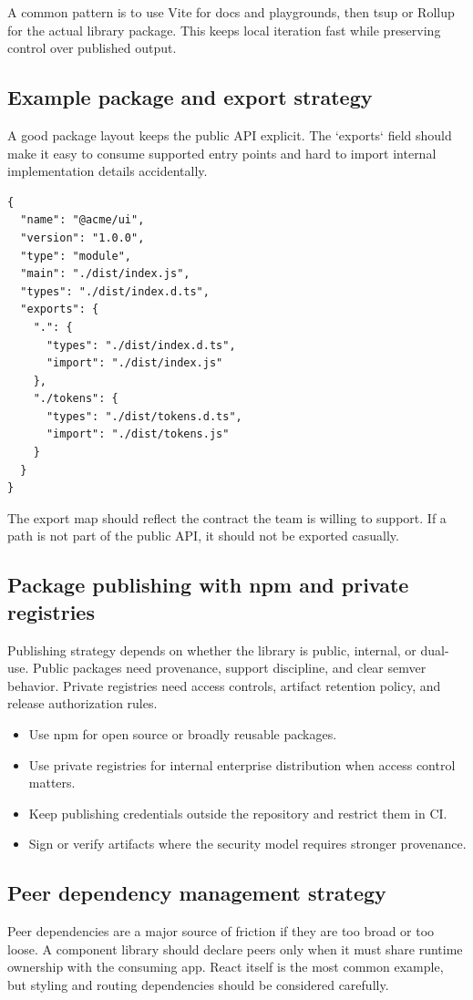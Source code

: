 A common pattern is to use Vite for docs and playgrounds, then tsup or Rollup for the actual library package. This keeps local iteration fast while preserving control over published output.

\subsection{Example package and export strategy}
A good package layout keeps the public API explicit. The `exports` field should make it easy to consume supported entry points and hard to import internal implementation details accidentally.

\begin{verbatim}
{
  "name": "@acme/ui",
  "version": "1.0.0",
  "type": "module",
  "main": "./dist/index.js",
  "types": "./dist/index.d.ts",
  "exports": {
    ".": {
      "types": "./dist/index.d.ts",
      "import": "./dist/index.js"
    },
    "./tokens": {
      "types": "./dist/tokens.d.ts",
      "import": "./dist/tokens.js"
    }
  }
}
\end{verbatim}

The export map should reflect the contract the team is willing to support. If a path is not part of the public API, it should not be exported casually.

\subsection{Package publishing with npm and private registries}
Publishing strategy depends on whether the library is public, internal, or dual-use. Public packages need provenance, support discipline, and clear semver behavior. Private registries need access controls, artifact retention policy, and release authorization rules.

\begin{itemize}[leftmargin=*, itemsep=0.35em]
  \item Use npm for open source or broadly reusable packages.
  \item Use private registries for internal enterprise distribution when access control matters.
  \item Keep publishing credentials outside the repository and restrict them in CI.
  \item Sign or verify artifacts where the security model requires stronger provenance.
\end{itemize}

\subsection{Peer dependency management strategy}
Peer dependencies are a major source of friction if they are too broad or too loose. A component library should declare peers only when it must share runtime ownership with the consuming app. React itself is the most common example, but styling and routing dependencies should be considered carefully.

